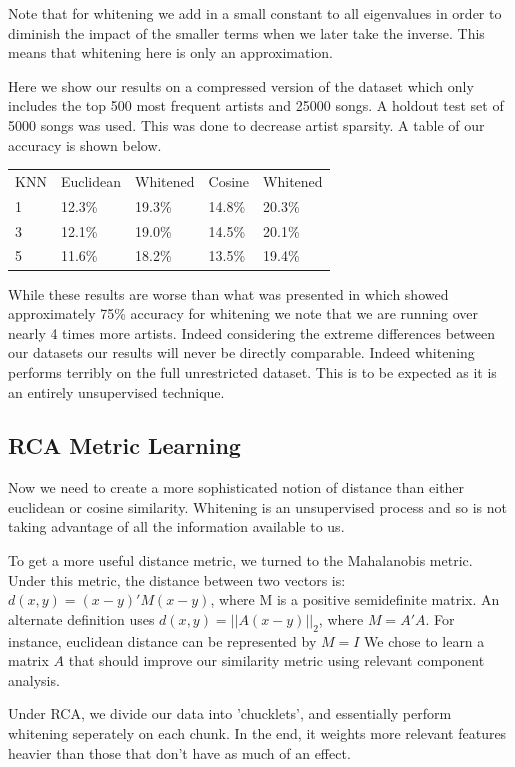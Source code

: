 \documentclass[a4paper,10pt]{article}
\begin{document}
Note that for whitening we add in a small constant to all eigenvalues in order to diminish the impact of the smaller terms when we later take the inverse. This means that whitening here is only an approximation. 

Here we show our results on a compressed version of the dataset which only includes the top 500 most frequent artists and 25000 songs. A holdout test set of 5000 songs was used. This was done to decrease artist sparsity. A table of our accuracy is shown below.
\label{Foo} 
\begin{center}
\begin{tabular}{lllll}
KNN & Euclidean & Whitened & Cosine & Whitened\\
1 & 12.3\% & 19.3\% & 14.8\% & 20.3\%\\
3 & 12.1\% & 19.0\% & 14.5\% & 20.1\% \\
5 & 11.6\% & 18.2\% & 13.5\% & 19.4\% 
\end{tabular}
\end{center}
While these results are worse than what was presented in \cite{Slaney_learninga} which showed approximately 75\% accuracy for whitening we note that we are running over nearly 4 times more artists. Indeed considering the extreme differences between our datasets our results will never be directly comparable. Indeed whitening performs terribly on the full unrestricted dataset. This is to be expected as it is an entirely unsupervised technique.
\subsection{RCA Metric Learning}
Now we need to create a more sophisticated notion of distance than either euclidean or cosine similarity. Whitening is an unsupervised process and so is not taking advantage of all the information available to us. 

To get a more useful distance metric, we turned to the Mahalanobis metric. Under this metric, the distance between two vectors is: $d(x,y)=(x-y)'M(x-y)$, where M is a positive semidefinite matrix. An alternate definition uses $d(x,y)=||A(x-y)||_2$, where $M=A'A$. For instance, euclidean distance can be represented by $M=I$
We chose to learn a matrix $A$ that should improve our similarity metric using relevant component analysis.

Under RCA, we divide our data into 'chucklets', and essentially perform whitening seperately on each chunk. In the end, it weights more relevant features heavier than those that don't have as much of an effect.
\end{document}
